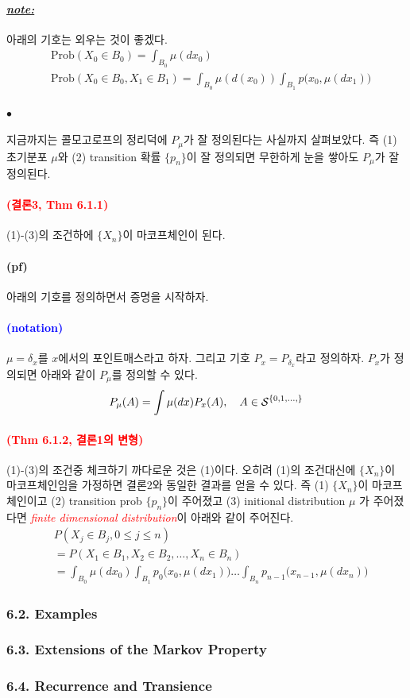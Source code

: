 \documentclass[12pt,oneside,english]{book}
\def\ck{\paragraph{\Large$\bullet$}\Large}
\def\pf{\paragraph{\Large(pf)}\Large}
\def\note{\paragraph{\Large\textit{\underline{note:}}}\Large}
\newcommand{\parablue}[1]{\paragraph{\Large\textcolor{blue}{(#1)}}\Large}
\newcommand{\parared}[1]{\paragraph{\Large\textcolor{red}{(#1)}}\Large}
\begin{document}
\note 아래의 기호는 외우는 것이 좋겠다. 
\begin{align*}
& \mbox{Prob}(X_0\in B_0)= \int_{B_0} \mu(dx_0)\\ 
& \mbox{Prob}(X_0\in B_0,X_1 \in B_1)= \int_{B_0} \mu(d(x_0)) \int_{B_1} p\big(x_0,\mu(dx_1)\big) \\ 
\end{align*}

\ck 지금까지는 콜모고로프의 정리덕에 $P_{\mu}$가 잘 정의된다는 사실까지 살펴보았다. 즉 (1) 초기분포 $\mu$와 (2) transition 확률 $\{p_n\}$이 잘 정의되면 무한하게 눈을 쌓아도 $P_{\mu}$가 잘 정의된다. 

\parared{결론3, Thm 6.1.1} (1)-(3)의 조건하에 $\{X_n\}$이 마코프체인이 된다. 
\pf 아래의 기호를 정의하면서 증명을 시작하자. 
\parablue{notation}
$\mu=\delta_x$를 $x$에서의 포인트매스라고 하자. 그리고 기호 $P_x=P_{\delta_x}$라고 정의하자. $P_x$가 정의되면 아래와 같이 $P_{\mu}$를 정의할 수 있다. 
\[
P_{\mu}(A)=\int \mu(dx)P_x(A), \quad A \in {\cal S}^{\{0,1,\dots,\}}
\]

\parared{Thm 6.1.2, 결론1의 변형} (1)-(3)의 조건중 체크하기 까다로운 것은 (1)이다. 오히려 (1)의 조건대신에 $\{X_n\}$이 마코프체인임을 가정하면 결론2와 동일한 결과를 얻을 수 있다. 즉 (1) $\{X_n\}$이 마코프체인이고 (2) transition prob $\{p_n\}$이 주어졌고 (3) initional distribution $\mu$ 가 주어졌다면 \textcolor{red}{\emph{finite dimensional distribution}}이 아래와 같이 주어진다. 
\begin{align*}
& P(X_j \in B_j, 0\leq j \leq n) \\ 
& = P(X_1\in B_1, X_2\in B_2, \dots, X_n \in B_n)\\
& = \int_{B_0}\mu(dx_0)\int_{B_1}p_0\big(x_0,\mu(dx_1)\big)\dots\int_{B_n}p_{n-1}\big(x_{n-1},\mu(dx_n)\big)
\end{align*}

\subsubsection{6.2. Examples}

\subsubsection{6.3. Extensions of the Markov Property}

\subsubsection{6.4. Recurrence and Transience}
\end{document}
